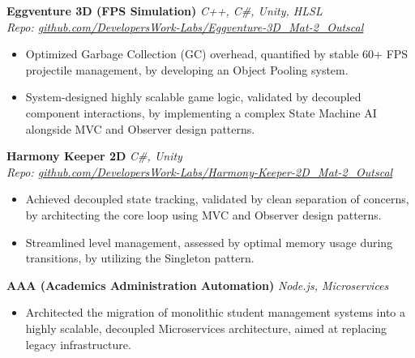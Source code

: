 \documentclass[10pt, letterpaper]{article}
\begin{document}
\vspace{2pt}

\noindent \textbf{Eggventure 3D (FPS Simulation)} \hfill \textit{C++, C\#, Unity, HLSL} \\
\textit{Repo: \href{https://github.com/DevelopersWork-Labs/Eggventure-3D_Mat-2_Outscal}{github.com/DevelopersWork-Labs/Eggventure-3D\_Mat-2\_Outscal}}
\begin{itemize}
    \setlength{\itemsep}{1pt}
    \item Optimized Garbage Collection (GC) overhead, quantified by stable 60+ FPS projectile management, by developing an Object Pooling system.
    \item System-designed highly scalable game logic, validated by decoupled component interactions, by implementing a complex State Machine AI alongside MVC and Observer design patterns.
\end{itemize}

\vspace{2pt}

\noindent \textbf{Harmony Keeper 2D} \hfill \textit{C\#, Unity} \\
\textit{Repo: \href{https://github.com/DevelopersWork-Labs/Harmony-Keeper-2D_Mat-2_Outscal}{github.com/DevelopersWork-Labs/Harmony-Keeper-2D\_Mat-2\_Outscal}}
\begin{itemize}
    \setlength{\itemsep}{1pt}
    \item Achieved decoupled state tracking, validated by clean separation of concerns, by architecting the core loop using MVC and Observer design patterns.
    \item Streamlined level management, assessed by optimal memory usage during transitions, by utilizing the Singleton pattern.
\end{itemize}

\vspace{2pt}

\noindent \textbf{AAA (Academics Administration Automation)} \hfill \textit{Node.js, Microservices}
\begin{itemize}
    \setlength{\itemsep}{1pt}
    \item Architected the migration of monolithic student management systems into a highly scalable, decoupled Microservices architecture, aimed at replacing legacy infrastructure.
\end{itemize}

\vspace{2pt}
\end{document}
